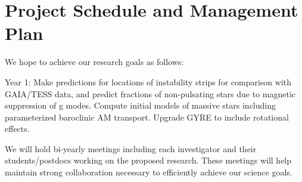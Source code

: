 \section{Project Schedule and Management Plan}

We hope to achieve our research goals as follows:

Year 1: Make predictions for locations of instability strips for comparison with GAIA/TESS data, and predict fractions of non-pulsating stars due to magnetic suppression of g modes. Compute initial models of massive stars including parameterized baroclinic AM transport.  Upgrade GYRE to include rotational effects. 

We will  hold bi-yearly meetings including each investigator and their students/postdocs working on the proposed research. These meetings will help maintain strong collaboration necessary to efficiently achieve our science goals.

